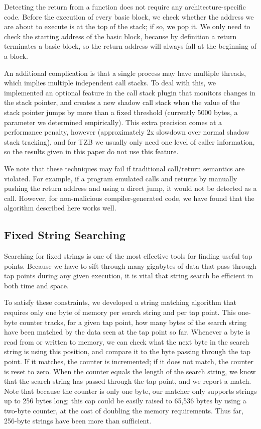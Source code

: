 Detecting the return from a function does not require any
architecture-specific code. Before the execution of every basic block,
we check whether the address we are about to execute is at the top of
the stack; if so, we pop it. We only need to check the starting address
of the basic block, because by definition a return terminates a basic
block, so the return address will always fall at the beginning of a
block.

An additional complication is that a single process may have multiple
threads, which implies multiple independent call stacks. To deal with
this, we implemented an optional feature in the call stack plugin that
monitors changes in the stack pointer, and creates a new shadow call
stack when the value of the stack pointer jumps by more than a fixed
threshold (currently 5000 bytes, a parameter we determined empirically).
This extra precision comes at a performance penalty, however
(approximately 2x slowdown over normal shadow stack tracking), and for
TZB we usually only need one level of caller information, so the results
given in this paper do not use this feature.

We note that these techniques may fail if traditional call/return
semantics are violated. For example, if a program emulated calls and
returns by manually pushing the return address and using a direct jump,
it would not be detected as a call. However, for non-malicious
compiler-generated code, we have found that the algorithm described here
works well.

\subsection{Fixed String Searching}
\label{sec:implementation:subsec:stringsearch}

Searching for fixed strings is one of the most effective tools for
finding useful tap points. Because we have to sift through many
gigabytes of data that pass through tap points during any given
execution, it is vital that string search be efficient in both time and
space.

To satisfy these constraints, we developed a string matching algorithm
that requires only one byte of memory per search string and per tap
point. This one-byte counter tracks, for a given tap point, how many
bytes of the search string have been matched by the data seen at the tap
point so far. Whenever a byte is read from or written to memory, we can
check what the next byte in the search string is using this position,
and compare it to the byte passing through the tap point. If it matches,
the counter is incremented; if it does not match, the counter is reset
to zero. When the counter equals the length of the search string, we
know that the search string has passed through the tap point, and we
report a match. Note that because the counter is only one byte, our
matcher only supports strings up to 256 bytes long; this cap could be
easily raised to 65,536 bytes by using a two-byte counter, at the cost
of doubling the memory requirements. Thus far, 256-byte strings have
been more than sufficient.


